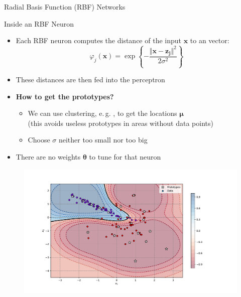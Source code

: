 \begin{frame}{Radial Basis Function (RBF) Networks}{}
	
\end{frame}


\begin{frame}{Inside an RBF Neuron}{}
	\begin{itemize}
		\item Each RBF neuron computes the distance of the input $\bm{x}$ to an  vector:
		\begin{equation}
			\varphi_j(\bm{x}) = \exp\left\{ -\frac{\Vert \bm{x} - \bm{z_j} \Vert^2}{2\sigma^2} \right\}
		\end{equation}
		\item These distances are then fed into the perceptron
		\item \textbf{How to get the prototypes?}
		\begin{itemize}
			\item We can use clustering, e.\,g. , to get the locations $\bm{\mu}$ \\
				{\footnotesize (this avoids useless prototypes in areas without data points)}
			\item Choose $\sigma$ neither too small nor too big
		\end{itemize}
		\item There are no weights $\bm{\theta}$ to tune for that neuron
	\end{itemize}
\end{frame}


\begin{frame}[plain]{}{}
	\vspace*{-7mm}
	\begin{figure}
		\centering
		\includegraphics[scale=0.55]{10_deep_learning/02_img/rbfn}
	\end{figure}
\end{frame}


